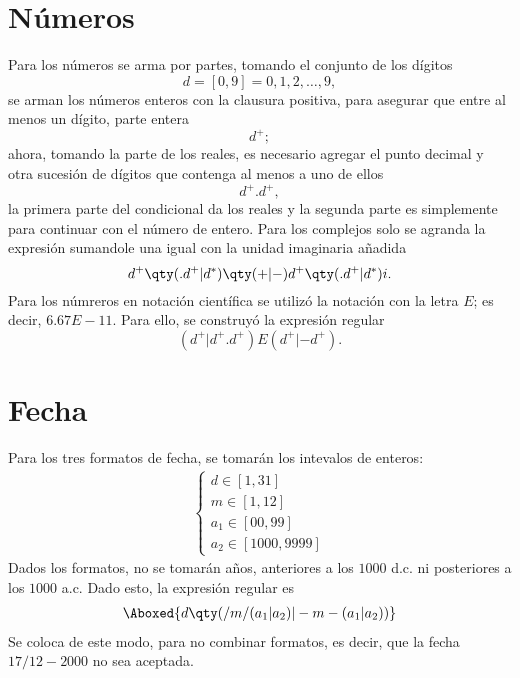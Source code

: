 \section{Números}
Para los números se arma por partes, tomando el conjunto de los dígitos
	$$d = [0,9] = {0,1,2,\ldots ,9},$$
se arman los números enteros con la clausura positiva, para asegurar que entre al menos un dígito, parte entera
	$$d^+;$$
ahora, tomando la parte de los reales, es necesario agregar el punto decimal y otra sucesión de dígitos que contenga al menos a uno de ellos
	$$d^+ .d^+,$$
la primera parte del condicional da los reales y la segunda parte es simplemente para continuar con el número de entero. Para los complejos solo se agranda la expresión sumandole una igual con la unidad imaginaria añadida
	$$d^+ \qty(.d^+ |d^*) \qty(+|-) d^+ \qty(.d^+ |d^*)i.$$
Para los númreros en notación científica se utilizó la notación con la letra $E$; es decir, $6.67E-11$. Para ello, se construyó la expresión regular
	$$(d^+|d^+.d^+)E(d^+|-d^+).$$




\section{Fecha}
Para los tres formatos de fecha, se tomarán los intevalos de enteros:
\begin{align*}
	\left\{\begin{array}{c}
		d \in [1,31] \\
		m \in [1,12] \\
		a_1 \in [00,99] \\
		a_2 \in [1000,9999]
	\end{array}\right.
\end{align*}
Dados los formatos, no se tomarán años, anteriores a los $1000$ d.c. ni posteriores a los $1000$ a.c. Dado esto, la expresión regular es
\begin{align*}
	\Aboxed{d\qty(/m/(a_1|a_2)|-m-(a_1|a_2))}
\end{align*}
Se coloca de este modo, para no combinar formatos, es decir, que la fecha $17/12-2000$ no sea aceptada.





